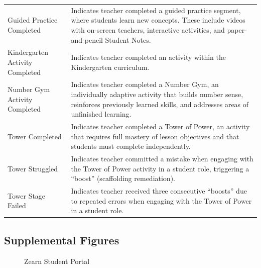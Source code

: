 \documentclass[
  number,
  preprint,
  3p,
  onecolumn]{elsarticle}
\begin{document}
\begin{longtable}[]{@{}
  >{\raggedright\arraybackslash}p{}
  >{\raggedright\arraybackslash}p{}@{}}
Guided Practice Completed \citep{zearn2024r} & Indicates teacher
completed a guided practice segment, where students learn new concepts.
These include videos with on-screen teachers, interactive activities,
and paper-and-pencil Student Notes. \\
Kindergarten Activity Completed \citep{zearn2024s} & Indicates teacher
completed an activity within the Kindergarten curriculum. \\
Number Gym Activity Completed \citep{zearn2024t} & Indicates teacher
completed a Number Gym, an individually adaptive activity that builds
number sense, reinforces previously learned skills, and addresses areas
of unfinished learning. \\
Tower Completed \citep{zearn2024b} & Indicates teacher completed a Tower
of Power, an activity that requires full mastery of lesson objectives
and that students must complete independently. \\
Tower Struggled \citep{zearn2024u} & Indicates teacher committed a
mistake when engaging with the Tower of Power activity in a student
role, triggering a ``boost'' (scaffolding remediation). \\
Tower Stage Failed \citep{zearn2024b} & Indicates teacher received three
consecutive ``boosts'' due to repeated errors when engaging with the
Tower of Power in a student role. \\
\end{longtable}

\newpage{}

\subsection{Supplemental Figures}\label{sec-supp-fig}

\begin{figure}


\caption{\label{fig-st-portal}Zearn Student Portal}

\end{figure}%
\end{document}

